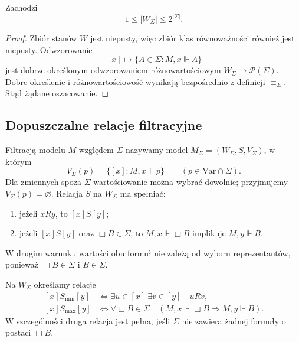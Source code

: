 \begin{stwierdzenie}
\label{prop:ncl-kripke-filtration-bound}
Zachodzi
\[
 1\leq |W_\Sigma|\leq 2^{|\Sigma|}.
\]
\end{stwierdzenie}
\begin{proof}
Zbiór stanów $W$ jest niepusty, więc zbiór klas
równoważności również jest niepusty.
Odwzorowanie
\[
 [x]\longmapsto\{A\in\Sigma:M,x\Vdash A\}
\]
jest dobrze określonym odwzorowaniem różnowartościowym
$W_\Sigma\to\mathcal P(\Sigma)$.
Dobre określenie i różnowartościowość wynikają
bezpośrednio z definicji $\equiv_\Sigma$.
Stąd żądane oszacowanie.
\end{proof}

\subsection{Dopuszczalne relacje filtracyjne}

\begin{definicja}
\label{def:ncl-kripke-filtration}
Filtracją modelu $M$ względem $\Sigma$
nazywamy model $M_\Sigma=(W_\Sigma,S,V_\Sigma)$,
w którym
\[
 V_\Sigma(p)=\{[x]:M,x\Vdash p\}
       \qquad(p\in\mathrm{Var}\cap\Sigma).
\]
Dla zmiennych spoza $\Sigma$ wartościowanie
można wybrać dowolnie; przyjmujemy
$V_\Sigma(p)=\varnothing$.
Relacja $S$ na $W_\Sigma$ ma spełniać:
\begin{enumerate}
 \item jeżeli $xRy$, to $[x]S[y]$;
 \item jeżeli $[x]S[y]$ oraz $\Box B\in\Sigma$,
 to $M,x\Vdash\Box B$ implikuje $M,y\Vdash B$.
\end{enumerate}
W drugim warunku wartości obu formuł
nie zależą od wyboru reprezentantów,
ponieważ $\Box B\in\Sigma$ i $B\in\Sigma$.
\end{definicja}

\begin{definicja}
\label{def:ncl-kripke-filtration-extremes}
Na $W_\Sigma$ określamy relacje
\[
\begin{aligned}
 [x]S_{\min}[y]
 &\iff \exists u\in[x]\ \exists v\in[y]\quad uRv,\\
 [x]S_{\max}[y]
 &\iff \forall\Box B\in\Sigma\quad
       (M,x\Vdash\Box B\Rightarrow M,y\Vdash B).
\end{aligned}
\]
W szczególności druga relacja jest pełna,
jeśli $\Sigma$ nie zawiera żadnej formuły
o postaci $\Box B$.
\end{definicja}

